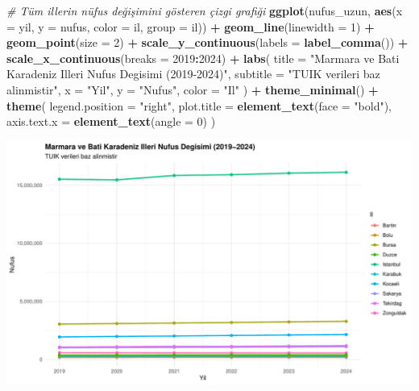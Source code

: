 \documentclass[
]{article}
\newenvironment{Shaded}{\begin{snugshade}}{\end{snugshade}}
\newcommand{\AttributeTok}[1]{\textcolor[rgb]{0.13,0.29,0.53}{#1}}
\newcommand{\CommentTok}[1]{\textcolor[rgb]{0.56,0.35,0.01}{\textit{#1}}}
\newcommand{\DecValTok}[1]{\textcolor[rgb]{0.00,0.00,0.81}{#1}}
\newcommand{\FunctionTok}[1]{\textcolor[rgb]{0.13,0.29,0.53}{\textbf{#1}}}
\newcommand{\NormalTok}[1]{#1}
\newcommand{\SpecialCharTok}[1]{\textcolor[rgb]{0.81,0.36,0.00}{\textbf{#1}}}
\newcommand{\StringTok}[1]{\textcolor[rgb]{0.31,0.60,0.02}{#1}}
\begin{document}
\begin{Shaded}
\begin{Highlighting}[]
\CommentTok{\# Tüm illerin nüfus değişimini gösteren çizgi grafiği}
\FunctionTok{ggplot}\NormalTok{(nufus\_uzun, }\FunctionTok{aes}\NormalTok{(}\AttributeTok{x =}\NormalTok{ yil, }\AttributeTok{y =}\NormalTok{ nufus, }\AttributeTok{color =}\NormalTok{ il, }\AttributeTok{group =}\NormalTok{ il)) }\SpecialCharTok{+}
  \FunctionTok{geom\_line}\NormalTok{(}\AttributeTok{linewidth =} \DecValTok{1}\NormalTok{) }\SpecialCharTok{+}
  \FunctionTok{geom\_point}\NormalTok{(}\AttributeTok{size =} \DecValTok{2}\NormalTok{) }\SpecialCharTok{+}
  \FunctionTok{scale\_y\_continuous}\NormalTok{(}\AttributeTok{labels =} \FunctionTok{label\_comma}\NormalTok{()) }\SpecialCharTok{+}
  \FunctionTok{scale\_x\_continuous}\NormalTok{(}\AttributeTok{breaks =} \DecValTok{2019}\SpecialCharTok{:}\DecValTok{2024}\NormalTok{) }\SpecialCharTok{+}
  \FunctionTok{labs}\NormalTok{(}
    \AttributeTok{title =} \StringTok{"Marmara ve Bati Karadeniz Illeri Nufus Degisimi (2019{-}2024)"}\NormalTok{,}
    \AttributeTok{subtitle =} \StringTok{"TUIK verileri baz alinmistir"}\NormalTok{,}
    \AttributeTok{x =} \StringTok{"Yil"}\NormalTok{,}
    \AttributeTok{y =} \StringTok{"Nufus"}\NormalTok{,}
    \AttributeTok{color =} \StringTok{"Il"}
\NormalTok{  ) }\SpecialCharTok{+}
  \FunctionTok{theme\_minimal}\NormalTok{() }\SpecialCharTok{+}
  \FunctionTok{theme}\NormalTok{(}
    \AttributeTok{legend.position =} \StringTok{"right"}\NormalTok{,}
    \AttributeTok{plot.title =} \FunctionTok{element\_text}\NormalTok{(}\AttributeTok{face =} \StringTok{"bold"}\NormalTok{),}
    \AttributeTok{axis.text.x =} \FunctionTok{element\_text}\NormalTok{(}\AttributeTok{angle =} \DecValTok{0}\NormalTok{)}
\NormalTok{  )}
\end{Highlighting}
\end{Shaded}

\includegraphics{cigdem_ucar_Rmarkdown_odevi_files/figure-latex/tum-iller-grafik-1.pdf}
\end{document}
